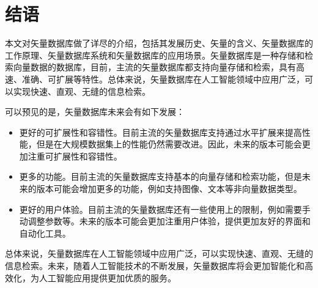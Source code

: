 \section{结语}

本文对矢量数据库做了详尽的介绍，包括其发展历史、矢量的含义、矢量数据库的工作原理、矢量数据库系统和矢量数据库的应用场景。矢量数据库是一种存储和检索向量数据的数据库，目前，主流的矢量数据库都支持向量存储和检索，具有高速、准确、可扩展等特性。总体来说，矢量数据库在人工智能领域中应用广泛，可以实现快速、直观、无缝的信息检索。

可以预见的是，矢量数据库未来会有如下发展：
\begin{itemize}
    \item 更好的可扩展性和容错性。目前主流的矢量数据库支持通过水平扩展来提高性能，但是在大规模数据集上的性能仍然需要改进。因此，未来的版本可能会更加注重可扩展性和容错性。
    \item 更多的功能。目前主流的矢量数据库支持基本的向量存储和检索功能，但是未来的版本可能会增加更多的功能，例如支持图像、文本等非向量数据类型。
    \item 更好的用户体验。目前主流的矢量数据库还有一些使用上的限制，例如需要手动调整参数等。未来的版本可能会更加注重用户体验，提供更加友好的界面和自动化工具。
\end{itemize}

总体来说，矢量数据库在人工智能领域中应用广泛，可以实现快速、直观、无缝的信息检索。未来，随着人工智能技术的不断发展，矢量数据库将会更加智能化和高效化，为人工智能应用提供更加优质的服务。
